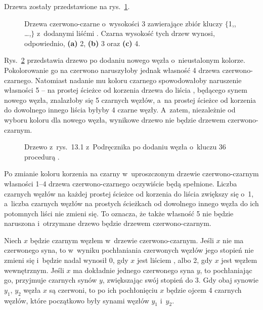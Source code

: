 
\exercise %
Drzewa zostały przedstawione na rys.\ \ref{fig:13.1-1}.
\begin{figure}[!ht]
	\centering 
	\caption{Drzewa czerwono-czarne o~wysokości 3 zawierające zbiór kluczy $\{$1,,\! \dots,$\}$ z~dodanymi liśćmi .
	Czarna wysokość tych drzew wynosi, odpowiednio, {\sffamily\bfseries(a)} 2, {\sffamily\bfseries(b)} 3 oraz {\sffamily\bfseries(c)} 4.} \label{fig:13.1-1}
\end{figure}

\exercise %
Rys.\ \ref{fig:13.1-2} przedstawia drzewo po dodaniu nowego węzła o~nieustalonym kolorze.
Pokolorowanie go na czerwono naruszyłoby jednak własność 4 drzewa czerwono-czarnego.
Natomiast nadanie mu koloru czarnego spowodowałoby naruszenie własności 5 -- na prostej ścieżce od korzenia drzewa do liścia , będącego synem nowego węzła, znalazłoby się 5 czarnych węzłów, a~na prostej ścieżce od korzenia do dowolnego innego liścia  byłyby 4 czarne węzły.
A~zatem, niezależnie od wyboru koloru dla nowego węzła, wynikowe drzewo nie będzie drzewem czerwono-czarnym.
\begin{figure}[!ht]
	\centering 
	\caption{Drzewo z~rys.\ 13.1 z~Podręcznika po dodaniu węzła o~kluczu 36 procedurą .} \label{fig:13.1-2}
\end{figure}

\exercise %
Po zmianie koloru korzenia na czarny w~uproszczonym drzewie czerwono-czarnym własności 1--4 drzewa czerwono-czarnego oczywiście będą spełnione.
Liczba czarnych węzłów na każdej prostej ścieżce od korzenia do liścia zwiększy się o~1, a~liczba czarnych węzłów na prostych ścieżkach od dowolnego innego węzła do ich potomnych liści nie zmieni się.
To oznacza, że także własność 5 nie będzie naruszona i~otrzymane drzewo będzie drzewem czerwono-czarnym.

\exercise %
Niech $x$ będzie czarnym węzłem w~drzewie czerwono-czarnym.
Jeśli $x$ nie ma czerwonego syna, to w~wyniku pochłaniania czerwonych węzłów jego stopień nie zmieni się i~będzie nadal wynosił 0, gdy $x$ jest liściem , albo 2, gdy $x$ jest węzłem wewnętrznym.
Jeśli $x$ ma dokładnie jednego czerwonego syna $y$, to pochłaniając go, przyjmuje czarnych synów $y$, zwiększając swój stopień do 3.
Gdy obaj synowie $y_1$, $y_2$ węzła $x$ są czerwoni, to po ich pochłonięciu $x$ będzie ojcem 4 czarnych węzłów, które początkowo były synami węzłów $y_1$ i~$y_2$.

